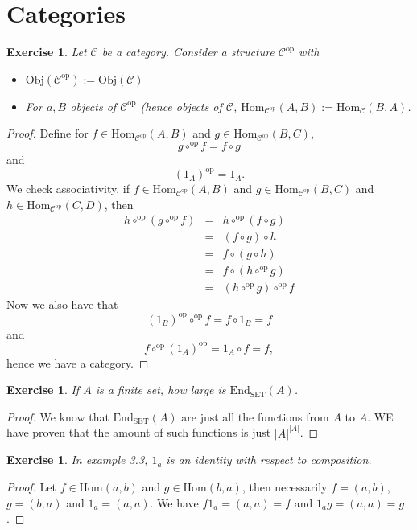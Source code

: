 \documentclass[a4paper, 11pt]{book}
\theoremstyle{plain}
\newtheorem{exercise}[theorem]{Exercise}
\theoremstyle{plain}
\begin{document}
\section{Categories}
\begin{exercise}
Let $\mathcal{C}$ be a category. Consider a structure $\mathcal{C}^\text{op}$ with
\begin{itemize}
\item $\text{Obj}(\mathcal{C}^\text{op}) := \text{Obj}(\mathcal{C})$
\item For $a,B$ objects of $\mathcal{C}^\text{op}$ (hence objects of $\mathcal{C}$, $\text{Hom}_{\mathcal{C}^\text{op}}(A,B) := \text{Hom}_\mathcal{C}(B,A)$.
\end{itemize}
\end{exercise}
\begin{proof}
Define for $f\in \text{Hom}_{\mathcal{C}^\text{op}}(A,B)$ and $g\in \text{Hom}_{\mathcal{C}^\text{op}}(B,C)$,
$$g\circ^\text{op} f = f\circ g$$
and
$$(1_A)^\text{op} = 1_A.$$
We check associativity, if $f\in \text{Hom}_{\mathcal{C}^\text{op}}(A,B)$ and $g\in \text{Hom}_{\mathcal{C}^\text{op}}(B,C)$ and $h\in \text{Hom}_{\mathcal{C}^\text{op}}(C,D)$, then
\begin{eqnarray*}
h\circ^\text{op} (g\circ^\text{op} f) 
& = & 
h\circ^\text{op} (f\circ g)\\
& = & (f\circ g)\circ h\\
& = & f\circ (g\circ h)\\
& = & f\circ (h\circ^\text{op} g)\\
& = & (h\circ^\text{op} g)\circ^\text{op} f
\end{eqnarray*}
Now we also have that
$$(1_B)^\text{op}\circ^\text{op} f = f\circ 1_B = f$$
and
$$f\circ^\text{op} (1_A)^\text{op} = 1_A\circ f= f,$$
hence we have a category.
\end{proof}

\begin{exercise}
If $A$ is a finite set, how large is $\text{End}_\text{SET}(A)$.
\end{exercise}
\begin{proof}
We know that $\text{End}_\text{SET}(A)$ are just all the functions from $A$ to $A$. WE have proven that the amount of such functions is just $|A|^{|A|}$.
\end{proof}

\begin{exercise}
In example 3.3, $1_a$ is an identity with respect to composition.
\end{exercise}
\begin{proof}
Let $f\in \text{Hom}(a,b)$ and $g\in \text{Hom}(b,a)$, then necessarily $f=(a,b)$, $g=(b,a)$ and $1_a = (a,a)$. We have $f1_a = (a,a) = f$ and $1_ag=(a,a)=g$.
\end{proof}
\end{document}
